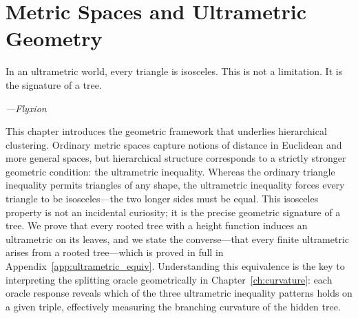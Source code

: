 \chapter{Metric Spaces and Ultrametric Geometry}
\label{ch:metrics}

\epigraph{%
  In an ultrametric world, every triangle is isosceles.
  This is not a limitation. It is the signature of a tree.%
}{\textit{---Flyxion}}

This chapter introduces the geometric framework that underlies hierarchical clustering. Ordinary metric spaces capture notions of distance in Euclidean and more general spaces, but hierarchical structure corresponds to a strictly stronger geometric condition: the ultrametric inequality. Whereas the ordinary triangle inequality permits triangles of any shape, the ultrametric inequality forces every triangle to be isosceles---the two longer sides must be equal. This isosceles property is not an incidental curiosity; it is the precise geometric signature of a tree. We prove that every rooted tree with a height function induces an ultrametric on its leaves, and we state the converse---that every finite ultrametric arises from a rooted tree---which is proved in full in Appendix~\ref{app:ultrametric_equiv}. Understanding this equivalence is the key to interpreting the splitting oracle geometrically in Chapter~\ref{ch:curvature}: each oracle response reveals which of the three ultrametric inequality patterns holds on a given triple, effectively measuring the branching curvature of the hidden tree.

